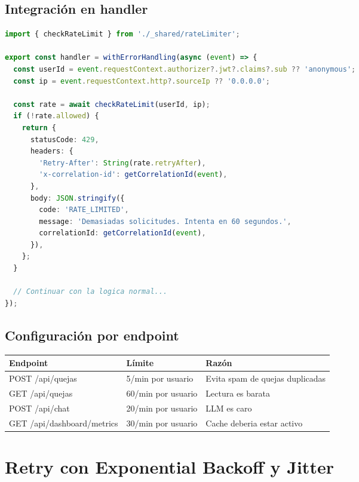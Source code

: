 \documentclass[11pt,a4paper]{article}
\begin{document}
\subsection{Integraci\'on en handler}

\begin{lstlisting}[language=TypeScript, caption={Rate limit en Lambda API Gateway}]
import { checkRateLimit } from './_shared/rateLimiter';

export const handler = withErrorHandling(async (event) => {
  const userId = event.requestContext.authorizer?.jwt?.claims?.sub ?? 'anonymous';
  const ip = event.requestContext.http?.sourceIp ?? '0.0.0.0';

  const rate = await checkRateLimit(userId, ip);
  if (!rate.allowed) {
    return {
      statusCode: 429,
      headers: {
        'Retry-After': String(rate.retryAfter),
        'x-correlation-id': getCorrelationId(event),
      },
      body: JSON.stringify({
        code: 'RATE_LIMITED',
        message: 'Demasiadas solicitudes. Intenta en 60 segundos.',
        correlationId: getCorrelationId(event),
      }),
    };
  }

  // Continuar con la logica normal...
});
\end{lstlisting}

\subsection{Configuraci\'on por endpoint}

\begin{longtable}{|p{5cm}|p{4cm}|p{4cm}|}
\hline
\rowcolor{primary!20}
\textbf{Endpoint} & \textbf{L\'imite} & \textbf{Raz\'on} \\
\hline
\endhead
POST /api/quejas & 5/min por usuario & Evita spam de quejas duplicadas \\
\hline
GET /api/quejas & 60/min por usuario & Lectura es barata \\
\hline
POST /api/chat & 20/min por usuario & LLM es caro \\
\hline
GET /api/dashboard/metrics & 30/min por usuario & Cache deberia estar activo \\
\hline
\end{longtable}

\section{Retry con Exponential Backoff y Jitter}
\end{document}
